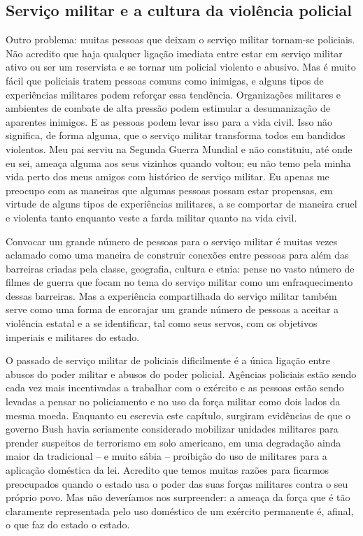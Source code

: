 \subsection*{Serviço militar e a cultura da violência policial}

Outro problema: muitas pessoas que deixam o serviço militar tornam-se policiais. Não acredito que haja qualquer ligação imediata entre estar em serviço militar ativo ou ser um reservista e se tornar um policial violento e abusivo. Mas é muito fácil que policiais tratem pessoas comuns como inimigas, e alguns tipos de experiências militares podem reforçar essa tendência. Organizações militares e ambientes de combate de alta pressão podem estimular a desumanização de aparentes inimigos. E as pessoas podem levar isso para a vida civil. Isso não significa, de forma alguma, que o serviço militar transforma todos em bandidos violentos. Meu pai serviu na Segunda Guerra Mundial e não constituiu, até onde eu sei, ameaça alguma aos seus vizinhos quando voltou; eu não temo pela minha vida perto dos meus amigos com histórico de serviço militar. Eu apenas me preocupo com as maneiras que algumas pessoas possam estar propensas, em virtude de alguns tipos de experiências militares, a se comportar de maneira cruel e violenta tanto enquanto veste a farda militar quanto na vida civil.

Convocar um grande número de pessoas para o serviço militar é muitas vezes aclamado como uma maneira de construir conexões entre pessoas para além das barreiras criadas pela classe, geografia, cultura e etnia: pense no vasto número de filmes de guerra que focam no tema do serviço militar como um enfraquecimento dessas barreiras. Mas a experiência compartilhada do serviço militar também serve como uma forma de encorajar um grande número de pessoas a aceitar a violência estatal e a se identificar, tal como seus servos, com os objetivos imperiais e militares do estado.

O passado de serviço militar de policiais dificilmente é a única ligação entre abusos do poder militar e abusos do poder policial. Agências policiais estão sendo cada vez mais incentivadas a trabalhar com o exército e as pessoas estão sendo levadas a pensar no policiamento e no uso da força militar como dois lados da mesma moeda. Enquanto eu escrevia este capítulo, surgiram evidências de que o governo Bush havia seriamente considerado mobilizar unidades militares para prender suspeitos de terrorismo em solo americano, em uma degradação ainda maior da tradicional -- e muito sábia -- proibição do uso de militares para a aplicação doméstica da lei. Acredito que temos muitas razões para ficarmos preocupados quando o estado usa o poder das suas forças militares contra o seu próprio povo. Mas não deveríamos nos surpreender: a ameaça da força que é tão claramente representada pelo uso doméstico de um exército permanente é, afinal, o que faz do estado o estado.

